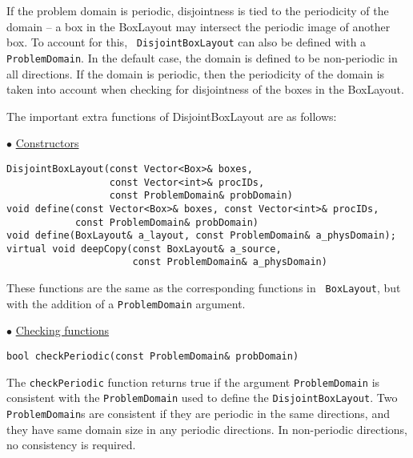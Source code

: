 If the problem domain is periodic, disjointness is tied to the
periodicity of the domain -- a box in the BoxLayout may intersect the
periodic image of another box.  To account for this, {\tt
DisjointBoxLayout} can also be defined with a {\tt ProblemDomain}.  In
the default case, the domain is defined to be non-periodic in all
directions.  If the domain is periodic, then the periodicity of the
domain is taken into account when checking for disjointness of the
boxes in the BoxLayout. 

The important extra functions of DisjointBoxLayout are as follows:
\begin{trivlist}
\item $\bullet$ \underline{Constructors}
\begin{verbatim}
DisjointBoxLayout(const Vector<Box>& boxes, 
                  const Vector<int>& procIDs,
                  const ProblemDomain& probDomain) 
void define(const Vector<Box>& boxes, const Vector<int>& procIDs,
            const ProblemDomain& probDomain)
void define(BoxLayout& a_layout, const ProblemDomain& a_physDomain);
virtual void deepCopy(const BoxLayout& a_source, 
                      const ProblemDomain& a_physDomain)
\end{verbatim}
These functions are the same as the corresponding functions in {\tt
BoxLayout}, but with the addition of a {\tt ProblemDomain} argument.
\item $\bullet$ \underline{Checking functions}
\begin{verbatim}
bool checkPeriodic(const ProblemDomain& probDomain)
\end{verbatim}
The {\tt checkPeriodic} function returns true if the argument
{\tt ProblemDomain} is consistent with the {\tt ProblemDomain} used to
define the {\tt DisjointBoxLayout}.  Two {\tt ProblemDomain}s are
consistent if they are periodic in the same directions, and they have
same domain size in any periodic directions.  In non-periodic
directions, no consistency is required.
\end{trivlist}
